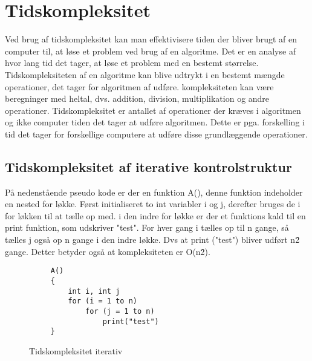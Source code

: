 \section{Tidskompleksitet}
Ved brug af tidskompleksitet kan man effektivisere tiden der bliver brugt af en computer til, at løse et problem ved brug af en algoritme. Det er en analyse af hvor lang tid det tager, at løse et problem med en bestemt størrelse. Tidskompleksiteten af en algoritme kan blive udtrykt i en bestemt mængde operationer, det tager for algoritmen af udføre. kompleksiteten kan være beregninger med heltal, dvs. addition, division, multiplikation og andre operationer. Tidskompleksitet er antallet af operationer der kræves i algoritmen og ikke computer tiden det tager at udføre algoritmen. Dette er pga. forskelling i tid det tager for forskellige computere at udføre disse grundlæggende operationer.\cite{Tidskompleksitet}

\subsection{Tidskompleksitet af iterative kontrolstruktur}
På nedenstående pseudo kode er der en funktion A(), denne funktion indeholder en nested for løkke. Først initialiseret to int variabler i og j, derefter bruges de i for løkken til at tælle op med. i den indre for løkke er der et funktions kald til en print funktion, som udskriver "test". For hver gang i tælles op til n gange, så tælles j også op n gange i den indre løkke.  Dvs at print ("test") bliver udført n\^2 gange. Detter betyder også at kompleksiteten er O(n\^2).

\begin{figure}[H]
\begin{lstlisting}
     A()
     {
         int i, int j
         for (i = 1 to n)
             for (j = 1 to n)
                 print("test") 
     }
\end{lstlisting}
\caption{Tidskompleksitet iterativ}\label{Tidskompleksitet}
\end{figure}

